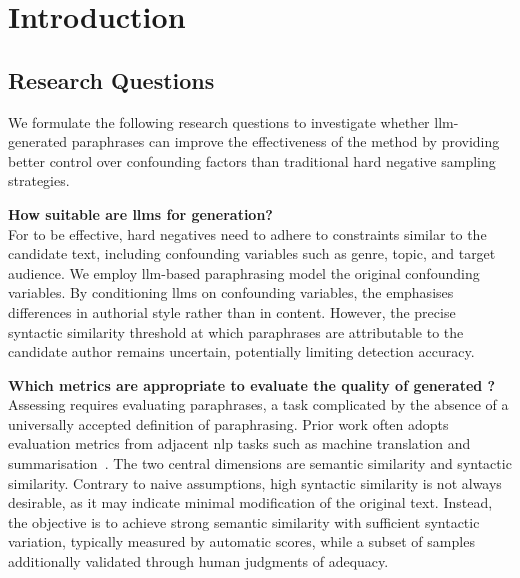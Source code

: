 \chapter{Introduction}
\label{chap:introduction}



\section{Research Questions}
\label{sec:research_questions}
We formulate the following research questions to investigate whether \ac{llm}-generated paraphrases can improve the effectiveness of the \imp{} method by providing better control over confounding factors than traditional hard negative sampling strategies.
\begin{questions}
    \item \textbf{How suitable are \acp{llm} for \imp{} generation?} \label{enum:rq1} \hfill \\
    For \imps{} to be effective, hard negatives need to adhere to constraints similar to the candidate text, including confounding variables such as genre, topic, and target audience.
    We employ \ac{llm}-based paraphrasing model the original confounding variables. 
    By conditioning \acp{llm} on confounding variables, the \impAppr{} emphasises differences in authorial style rather than in content. 
    However, the precise syntactic similarity threshold at which paraphrases are attributable to the candidate author remains uncertain, potentially limiting detection accuracy. 

    \item \textbf{Which metrics are appropriate to evaluate the quality of generated \imps{}?} \label{enum:rq2} \hfill \\
    Assessing \imps{} requires evaluating paraphrases, a task complicated by the absence of a universally accepted definition of paraphrasing. 
    Prior work often adopts evaluation metrics from adjacent \ac{nlp} tasks such as machine translation and summarisation~\citep{gohsen_captions_2023}. 
    The two central dimensions are semantic similarity and syntactic similarity. 
    Contrary to naive assumptions, high syntactic similarity is not always desirable, as it may indicate minimal modification of the original text.
    Instead, the objective is to achieve strong semantic similarity with sufficient syntactic variation, typically measured by automatic scores, while a subset of samples additionally validated through human judgments of adequacy.


\end{questions}
